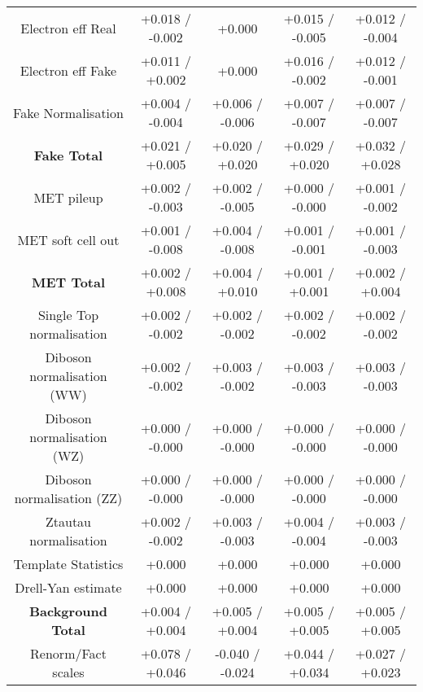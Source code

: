 \begin{table}[htbp]
\begin{center}
\begin{tabular}{|c|c|c|c|c|}
Electron eff Real                     &+0.018   / -0.002   & +0.000              & +0.015   / -0.005   & +0.012   / -0.004  \\
Electron eff Fake                     &+0.011   / +0.002   & +0.000              & +0.016   / -0.002   & +0.012   / -0.001  \\
Fake Normalisation                    &+0.004   / -0.004   & +0.006   / -0.006   & +0.007   / -0.007   & +0.007   / -0.007  \\
\hline
\textbf{Fake Total}                   &+0.021   / +0.005   & +0.020   / +0.020   & +0.029   / +0.020   & +0.032   / +0.028  \\
\hline
MET pileup                            &+0.002   / -0.003   & +0.002   / -0.005   & +0.000   / -0.000   & +0.001   / -0.002  \\
MET soft cell out                     &+0.001   / -0.008   & +0.004   / -0.008   & +0.001   / -0.001   & +0.001   / -0.003  \\
\hline
\textbf{MET Total}                    &+0.002   / +0.008   & +0.004   / +0.010   & +0.001   / +0.001   & +0.002   / +0.004  \\
\hline
Single Top normalisation              &+0.002   / -0.002   & +0.002   / -0.002   & +0.002   / -0.002   & +0.002   / -0.002  \\
Diboson normalisation (WW)            &+0.002   / -0.002   & +0.003   / -0.002   & +0.003   / -0.003   & +0.003   / -0.003  \\
Diboson normalisation (WZ)            &+0.000   / -0.000   & +0.000   / -0.000   & +0.000   / -0.000   & +0.000   / -0.000  \\
Diboson normalisation (ZZ)            &+0.000   / -0.000   & +0.000   / -0.000   & +0.000   / -0.000   & +0.000   / -0.000  \\
Ztautau normalisation                 &+0.002   / -0.002   & +0.003   / -0.003   & +0.004   / -0.004   & +0.003   / -0.003  \\
Template Statistics                   &+0.000              & +0.000              & +0.000              & +0.000             \\
Drell-Yan estimate                    &+0.000              & +0.000              & +0.000              & +0.000             \\
\hline
\textbf{Background Total}             &+0.004   / +0.004   & +0.005   / +0.004   & +0.005   / +0.005   & +0.005   / +0.005  \\
\hline
Renorm/Fact scales                    &+0.078   / +0.046   & -0.040   / -0.024   & +0.044   / +0.034   & +0.027   / +0.023  \\

\end{tabular}
\end{center}
\end{table}
